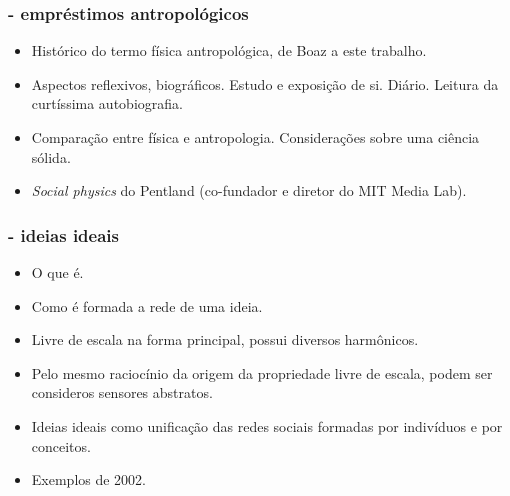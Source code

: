 \documentclass[10pt]{beamer}
\begin{document}
\begin{frame}
\frametitle{- empréstimos antropológicos}
\begin{itemize}
\item Histórico do termo física antropológica, de Boaz a este trabalho.
\item Aspectos reflexivos, biográficos. Estudo e exposição de si. Diário. Leitura da curtíssima autobiografia.
\item Comparação entre física e antropologia. Considerações sobre uma ciência sólida.
\item \emph{Social physics} do Pentland (co-fundador e diretor do MIT Media Lab).
\end{itemize}
\end{frame}

\begin{frame}
\frametitle{- ideias ideais}
\begin{itemize}
\item O que é.
\item Como é formada a rede de uma ideia.
\item Livre de escala na forma principal, possui diversos harmônicos.
\item Pelo mesmo raciocínio da origem da propriedade livre de escala, podem ser consideros sensores abstratos.
\item Ideias ideais como unificação das redes sociais formadas por indivíduos e por conceitos.
\item Exemplos de 2002.
\end{itemize}
\end{frame}
\end{document}
